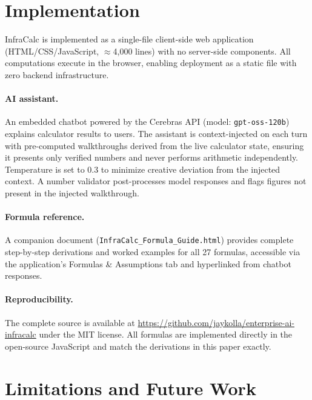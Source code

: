 \documentclass{article}
\begin{document}
\section{Implementation}
\label{sec:implementation}

InfraCalc is implemented as a single-file client-side web application
(HTML/CSS/JavaScript, $\approx$4,000 lines) with no server-side components.
All computations execute in the browser, enabling deployment as a static file
with zero backend infrastructure.

\paragraph{AI assistant.}
An embedded chatbot powered by the Cerebras API (model: \texttt{gpt-oss-120b})
explains calculator results to users. The assistant is context-injected on
each turn with pre-computed walkthroughs derived from the live calculator
state, ensuring it presents only verified numbers and never performs arithmetic
independently. Temperature is set to 0.3 to minimize creative deviation from
the injected context. A number validator post-processes model responses and
flags figures not present in the injected walkthrough.

\paragraph{Formula reference.}
A companion document (\texttt{InfraCalc\_Formula\_Guide.html}) provides
complete step-by-step derivations and worked examples for all 27 formulas,
accessible via the application's Formulas \& Assumptions tab and hyperlinked
from chatbot responses.

\paragraph{Reproducibility.}
The complete source is available at
\url{https://github.com/jaykolla/enterprise-ai-infracalc} under the MIT
license. All formulas are implemented directly in the open-source JavaScript
and match the derivations in this paper exactly.

\section{Limitations and Future Work}
\label{sec:limitations}
\end{document}
